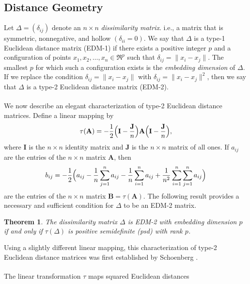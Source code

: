 \documentclass[10pt,twocolumn]{article}
\newtheorem{theorem}{Theorem}
\numberwithin{equation}{section}
\begin{document}
\subsection{Distance Geometry}
\label{sec:distance-geometry}
Let $\Delta = (\delta_{ij})$ denote an $n \times n$
{\em dissimilarity matrix}.
i.e., a matrix that is symmetric, nonnegative, and hollow
$(\delta_{ii}=0)$.
We say that $\Delta$ 
is a type-1 Euclidean distance matrix ({EDM-1}) if
there exists a positive integer $p$ and a configuration of points
$x_1,x_2,\dots, x_n \in \Re^p$ such that $\delta_{ij} = \| x_i - x_j
\|$. The smallest $p$ for which such a configuration exists
is the {\em embedding dimension}\/ of $\Delta$. 
If we replace the condition $\delta_{ij} = \| x_i - x_j \|$
with $\delta_{ij} = \| x_i - x_j\|^{2}$,
then we say that $\Delta$ is a type-2
Euclidean distance matrix (EDM-2). \\ \\
%
\noindent
We now describe an elegant characterization
of type-2 Euclidean distance matrices.
Define a linear mapping by
\begin{equation}
  \label{eq:1}
  \tau(\mathbf{A}) = -\frac{1}{2} \Bigl(\mathbf{I} -
  \frac{\mathbf{J}}{n}\Bigr) \mathbf{A} \Bigl(\mathbf{I} -
  \frac{\mathbf{J}}{n} \Bigr),
\end{equation}
where 
$\mathbf{I}$ is the $n \times n$ identity matrix and
$\mathbf{J}$ is the $n \times n$ matrix of all ones.  
If $a_{ij}$ are the entries of the $n \times n$ matrix
$\mathbf{A}$, then
\begin{equation*}
  b_{ij} = -\frac{1}{2}\Bigl(a_{ij} - \frac{1}{n}\sum_{j=1}^{n}a_{ij} -
  \frac{1}{n}\sum_{i=1}^{n}{a_{ij}} +
  \frac{1}{n^2}\sum_{i=1}^{n}\sum_{j=1}^{n}a_{ij}\Bigr)
\end{equation*}
are the entries of the $n \times n$ matrix
$\mathbf{B} = \tau(\mathbf{A})$. The following
result provides a necessary and
sufficient condition for $\Delta$ to be an EDM-2 matrix.
\begin{theorem}
  \label{thm:1}
  The dissimilarity matrix 
$\Delta$ is EDM-2 with embedding dimension $p$ if and only
  if $\tau(\Delta)$ is positive semidefinite (psd) with rank
  $p$. 
\end{theorem}
Using a slightly different linear mapping,
this characterization of type-2 Euclidean distance matrices
was first established by Schoenberg
\cite{schoenberg35:_remar_mauric_frech_sur_hilber}. \\ \\
%
\noindent
The linear transformation $\tau$ maps squared Euclidean distances
\end{document}
